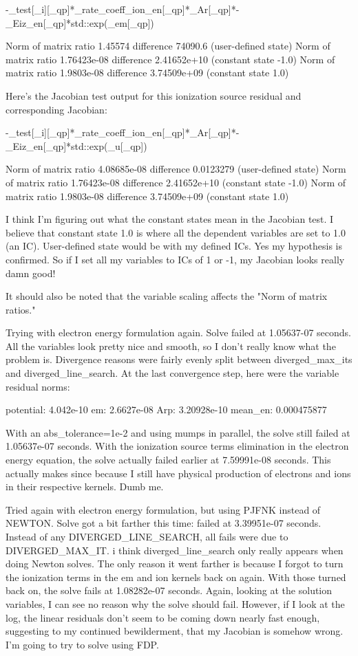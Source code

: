     -_test[_i][_qp]*_rate_coeff_ion_en[_qp]*_Ar[_qp]*-_Eiz_en[_qp]*std::exp(_em[_qp])

Norm of matrix ratio 1.45574 difference 74090.6 (user-defined state)
Norm of matrix ratio 1.76423e-08 difference 2.41652e+10 (constant state -1.0)
Norm of matrix ratio 1.9803e-08 difference 3.74509e+09 (constant state 1.0)

Here's the Jacobian test output for this ionization source residual and corresponding Jacobian:

    -_test[_i][_qp]*_rate_coeff_ion_en[_qp]*_Ar[_qp]*-_Eiz_en[_qp]*std::exp(_u[_qp])

Norm of matrix ratio 4.08685e-08 difference 0.0123279 (user-defined state)
Norm of matrix ratio 1.76423e-08 difference 2.41652e+10 (constant state -1.0)
Norm of matrix ratio 1.9803e-08 difference 3.74509e+09 (constant state 1.0)

I think I'm figuring out what the constant states mean in the Jacobian test. I believe that constant state 1.0 is where all the dependent variables are set to 1.0 (an IC). User-defined state would be with my defined ICs. Yes my hypothesis is confirmed. So if I set all my variables to ICs of 1 or -1, my Jacobian looks really damn good!

It should also be noted that the variable scaling affects the "Norm of matrix ratios."

Trying with electron energy formulation again. Solve failed at 1.05637-07 seconds. All the variables look pretty nice and smooth, so I don't really know what the problem is. Divergence reasons were fairly evenly split between diverged_max_its and diverged_line_search. At the last convergence step, here were the variable residual norms:

                  potential: 4.042e-10
                  em:        2.6627e-08
                  Arp:       3.20928e-10
                  mean_en:   0.000475877

With an abs_tolerance=1e-2 and using mumps in parallel, the solve still failed at 1.05637e-07 seconds. With the ionization source terms elimination in the electron energy equation, the solve actually failed earlier at 7.59991e-08 seconds. This actually makes since because I still have physical production of electrons and ions in their respective kernels. Dumb me.

Tried again with electron energy formulation, but using PJFNK instead of NEWTON. Solve got a bit farther this time: failed at 3.39951e-07 seconds. Instead of any DIVERGED_LINE_SEARCH, all fails were due to DIVERGED_MAX_IT. i think diverged_line_search only really appears when doing Newton solves. The only reason it went farther is because I forgot to turn the ionization terms in the em and ion kernels back on again. With those turned back on, the solve fails at 1.08282e-07 seconds. Again, looking at the solution variables, I can see no reason why the solve should fail. However, if I look at the log, the linear residuals don't seem to be coming down nearly fast enough, suggesting to my continued bewilderment, that my Jacobian is somehow wrong. I'm going to try to solve using FDP.

